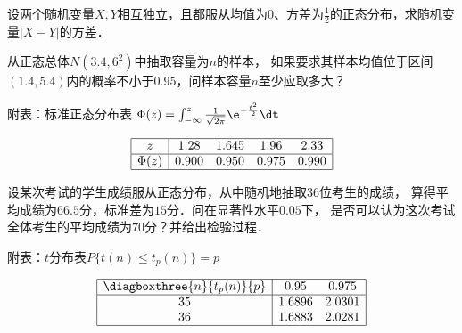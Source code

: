 \documentclass[plain,noanswer,medmath]{../../template/jnuexam}
\begin{document}
\begin{problem}
设两个随机变量$X,Y$相互独立，且都服从均值为$0$、方差为$\frac{1}{2}$的正态分布，求随机变量$|X - Y|$的方差．
\end{problem}



\begin{problem}
从正态总体$N\left(3.4,6^2 \right)$中抽取容量为$n$的样本，
如果要求其样本均值位于区间$(1.4,5.4)$内的概率不小于$0.95$，问样本容量$n$至少应取多大？
\par\centerline{附表：标准正态分布表
$\Phi(z) = \int_{-\infty}^z \frac{1}{\sqrt{2\pi}}\e^{-\frac{t^2}{2}}\dt$}\noindent
$$\begin{array}{|c|cccc|}
\hline
        z &  1.28 & 1.645 &  1.96 & 2.33 \\
\hline
  \Phi(z) & 0.900 & 0.950 & 0.975 & 0.990 \\
\hline
\end{array}$$
\end{problem}



\begin{problem}
设某次考试的学生成绩服从正态分布，从中随机地抽取$36$位考生的成绩，
算得平均成绩为$66.5$分，标准差为$15$分．问在显著性水平$0.05$下，
是否可以认为这次考试全体考生的平均成绩为$70$分？并给出检验过程．
\par\centerline{附表：$t$分布表$P\{t(n) \le t_p(n)\} = p$}\noindent
$$\begin{array}{|c|cc|}
\hline
  \diagboxthree{n}{t_p(n)}{p} &   0.95 & 0.975 \\
\hline
                           35 & 1.6896 & 2.0301 \\
                           36 & 1.6883 & 2.0281 \\
\hline
\end{array}$$
\end{problem}
\end{document}
